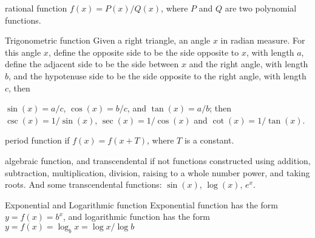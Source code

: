 \documentclass[Calculus 1 Recitation.tex]{subfiles}
\begin{document}
\begin{myleftlinebox}
	rational function
	\tcblower
	$f(x) = P(x)/Q(x)$, where $P$ and $Q$ are two polynomial functions.
\end{myleftlinebox}

\begin{myleftlinebox}
	Trigonometric function
	\tcblower
	Given a right triangle, an angle $x$ in radian measure. For this angle $x$, define the opposite side to be the side opposite to $x$, with length $a$, define the adjacent side to be the side between $x$ and the right angle, with length $b$, and the hypotenuse side to be the side opposite to the right angle, with length $c$, then
	
	$\sin(x) = a/c$, $\cos(x)=b/c$, and $\tan(x) = a/b$; then $\csc(x)=1/\sin(x)$, $\sec(x)=1/\cos(x)$ and $\cot(x)=1/	\tan(x)$.
	\begin{center}
		\usetikzlibrary{angles,quotes}
	\end{center}
\end{myleftlinebox}

\begin{myleftlinebox}
	period function
	\tcblower
	if $f(x)=f(x+T)$, where $T$ is a constant.
\end{myleftlinebox}

\begin{myleftlinebox}
	algebraic function, and transcendental if not
	\tcblower
	functions constructed using addition, subtraction, multiplication, division, raising to a whole number power, and taking roots. And some transcendental functions: $\sin(x)$, $\log(x)$, $e^x$.
\end{myleftlinebox}

\begin{myleftlinebox}
	Exponential and Logarithmic function
	\tcblower
	Exponential function has the form $y=f(x)=b^x$, and logarithmic function has the form $y=f(x)=\log_b x = \log x/\log b$
\end{myleftlinebox}
\end{document}
